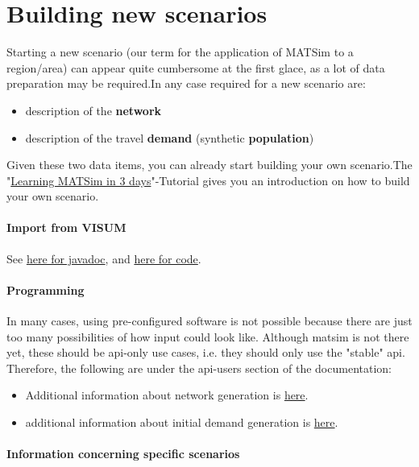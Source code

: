 \chapter{Building new scenarios}

Starting  a new scenario (our term for the application of MATSim to a  region/area) can appear quite cumbersome at the first glace, as a lot of  data preparation may be required.In any case required for a new  scenario are:
\begin{itemize}
	\item description of the \textbf{network}
	\item description of the travel \textbf{demand} (synthetic \textbf{population})
\end{itemize}

Given these two data items, you can already start building your own scenario.The "\href{http://www.matsim.org/docs/tutorials/learningIn3days}{Learning MATSim in 3 days}"-Tutorial gives you an introduction on how to build your own scenario.

\subsubsection{Import from VISUM}

See \href{http://matsim.org/javadoc/org/matsim/visum/package-summary.html}{here for javadoc}, and \href{http://matsim.org/xref/org/matsim/visum/package-summary.html}{here for code}.

\subsubsection{Programming}

In many cases, using pre-configured software is not possible because  there are just too many possibilities of how input could look like.  Although matsim is not there yet, these should be api-only use cases,  i.e. they should only use the "stable" api. Therefore, the  following are under the api-users section of the documentation:
\begin{itemize}
	\item Additional information about network generation is \href{http://matsim.org/node/588}{here}.
	\item additional information about initial demand generation is \href{http://matsim.org/node/340}{here}.
\end{itemize}

\subsubsection{Information concerning specific scenarios}

